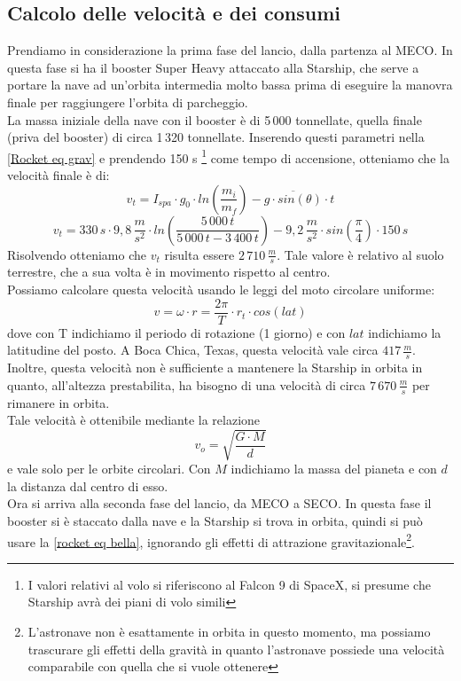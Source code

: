 \subsection{Calcolo delle velocità e dei consumi}
Prendiamo in considerazione la prima fase del lancio, dalla partenza al MECO. In questa fase si ha il booster Super Heavy attaccato alla Starship, che serve a portare la nave ad un'orbita intermedia molto bassa prima di eseguire la manovra finale per raggiungere l'orbita di parcheggio.\\
La massa iniziale della nave con il booster è di 5\,000 tonnellate, quella finale (priva del booster) di circa 1\,320 tonnellate.
Inserendo questi parametri nella \ref{Rocket eq grav} e prendendo 150 s \footnote{I valori relativi al volo si riferiscono al Falcon 9 di SpaceX, si presume che Starship avrà dei piani di volo simili} come tempo di accensione, otteniamo che la velocità finale è di:
$$
v_t = I_{spa} \cdot g_0 \cdot ln\left(\frac{m_i}{m_f}\right) - \overline{g \cdot sin(\theta)} \cdot t
$$
$$
v_t = 330\,s \cdot 9,8\,\frac{m}{s^2} \cdot ln\left(\frac{5\,000\,t}{5\,000\,t - 3\,400\,t}\right) - 9,2\,\frac{m}{s^2} \cdot sin\left(\frac{\pi}{4}\right) \cdot 150\,s
$$
Risolvendo otteniamo che $v_t$ risulta essere $2\,710\,\frac{m}{s}$. Tale valore è relativo al suolo terrestre, che a sua volta è in movimento rispetto al centro.\\
Possiamo calcolare questa velocità usando le leggi del moto circolare uniforme:\\
$$
v = \omega \cdot r = \frac{2 \pi}{T} \cdot r_t \cdot cos(lat)
$$
dove con T indichiamo il periodo di rotazione (1 giorno) e con $lat$ indichiamo la latitudine del posto.
A Boca Chica, Texas, questa velocità vale circa $417\,\frac{m}{s}$.\\
Inoltre, questa velocità non è sufficiente a mantenere la Starship in orbita in quanto, all'altezza prestabilita, ha bisogno di una velocità di circa 
$7\,670\,\frac{m}{s}$ per rimanere in orbita.\\
Tale velocità è ottenibile mediante la relazione
$$
v_o = \sqrt{\frac{G \cdot M}{d}}
$$
e vale solo per le orbite circolari. Con $M$ indichiamo la massa del pianeta e con $d$ la distanza dal centro di esso.\\
Ora si arriva alla seconda fase del lancio, da MECO a SECO. In questa fase il booster si è staccato dalla nave e la Starship si trova in orbita, quindi si può usare la \ref{rocket eq bella}, ignorando gli effetti di attrazione gravitazionale\footnote{L'astronave non è esattamente in orbita in questo momento, ma possiamo trascurare gli effetti della gravità in quanto l'astronave possiede una velocità comparabile con quella che si vuole ottenere}.
